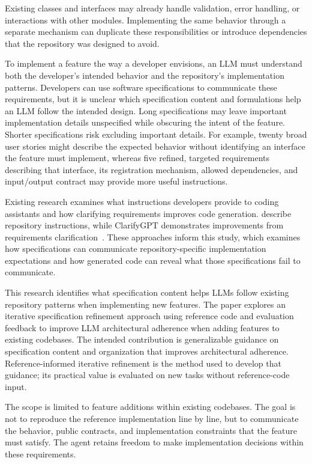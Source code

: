 \documentclass[sigconf,nonacm]{acmart}
\begin{document}
Existing classes and interfaces may already handle validation, error handling, or interactions with other modules. Implementing the same behavior through a separate mechanism can duplicate these responsibilities or introduce dependencies that the repository was designed to avoid.

To implement a feature the way a developer envisions, an LLM must understand both the developer's intended behavior and the repository's implementation patterns. Developers can use software specifications to communicate these requirements, but it is unclear which specification content and formulations help an LLM follow the intended design. Long specifications may leave important implementation details unspecified while obscuring the intent of the feature. Shorter specifications risk excluding important details. For example, twenty broad user stories might describe the expected behavior without identifying an interface the feature must implement, whereas five refined, targeted requirements describing that interface, its registration mechanism, allowed dependencies, and input/output contract may provide more useful instructions.

Existing research examines what instructions developers provide to coding assistants and how clarifying requirements improves code generation. \citet{jiang2025} describe repository instructions, while ClarifyGPT demonstrates improvements from requirements clarification~\citep{mu2024}. These approaches inform this study, which examines how specifications can communicate repository-specific implementation expectations and how generated code can reveal what those specifications fail to communicate.

This research identifies what specification content  helps LLMs follow existing repository patterns when implementing new features. The paper explores an iterative specification refinement approach using reference code and evaluation feedback to improve LLM architectural adherence when adding features to existing codebases. The intended contribution is generalizable guidance on specification content and organization that improves architectural adherence. Reference-informed iterative refinement is the method used to develop that guidance; its practical value is evaluated on new tasks without reference-code input.

The scope is limited to feature additions within existing codebases. The goal is not to reproduce the reference implementation line by line, but to communicate the behavior, public contracts, and implementation constraints that the feature must satisfy. The agent retains freedom to make implementation decisions within these requirements.
\end{document}
